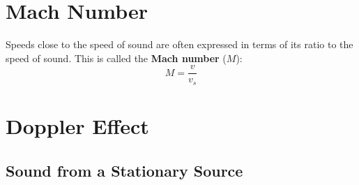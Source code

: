   
%
%  
%
%
%
%
\section{Mach Number}
Speeds close to the speed of sound are often expressed in terms of its ratio
to the speed of sound. This is called the \textbf{Mach number} ($M$):  
\begin{equation}
  \boxed{
    M=\frac v{v_s}
  }
\end{equation}
%
%
%
\section{Doppler Effect}


\subsection{Sound from a Stationary Source}

